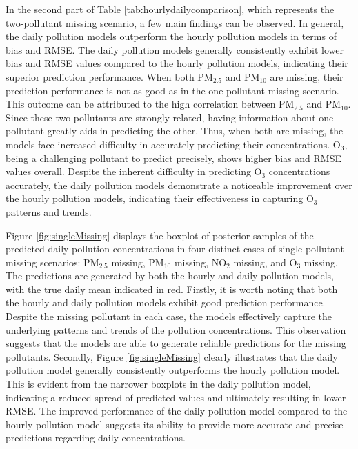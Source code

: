 \documentclass[
  12,
]{article}
\begin{document}
In the second part of Table \ref{tab:hourlydailycomparison}, which
represents the two-pollutant missing scenario, a few main findings can
be observed. In general, the daily pollution models outperform the
hourly pollution models in terms of bias and RMSE. The daily pollution
models generally consistently exhibit lower bias and RMSE values
compared to the hourly pollution models, indicating their superior
prediction performance. When both PM\(_{2.5}\) and PM\(_{10}\) are
missing, their prediction performance is not as good as in the
one-pollutant missing scenario. This outcome can be attributed to the
high correlation between PM\(_{2.5}\) and PM\(_{10}\). Since these two
pollutants are strongly related, having information about one pollutant
greatly aids in predicting the other. Thus, when both are missing, the
models face increased difficulty in accurately predicting their
concentrations. O\(_3\), being a challenging pollutant to predict
precisely, shows higher bias and RMSE values overall. Despite the
inherent difficulty in predicting O\(_3\) concentrations accurately, the
daily pollution models demonstrate a noticeable improvement over the
hourly pollution models, indicating their effectiveness in capturing
O\(_3\) patterns and trends.

Figure \ref{fig:singleMissing} displays the boxplot of posterior samples
of the predicted daily pollution concentrations in four distinct cases
of single-pollutant missing scenarios: PM\(_{2.5}\) missing, PM\(_{10}\)
missing, NO\(_2\) missing, and O\(_3\) missing. The predictions are
generated by both the hourly and daily pollution models, with the true
daily mean indicated in red. Firstly, it is worth noting that both the
hourly and daily pollution models exhibit good prediction performance.
Despite the missing pollutant in each case, the models effectively
capture the underlying patterns and trends of the pollution
concentrations. This observation suggests that the models are able to
generate reliable predictions for the missing pollutants. Secondly,
Figure \ref{fig:singleMissing} clearly illustrates that the daily
pollution model generally consistently outperforms the hourly pollution
model. This is evident from the narrower boxplots in the daily pollution
model, indicating a reduced spread of predicted values and ultimately
resulting in lower RMSE. The improved performance of the daily pollution
model compared to the hourly pollution model suggests its ability to
provide more accurate and precise predictions regarding daily
concentrations.
\end{document}
